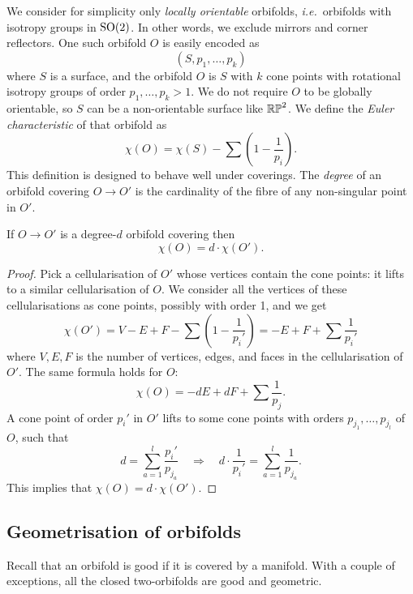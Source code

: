We consider for simplicity only \emph{locally orientable} orbifolds, \emph{i.e.}~orbifolds with isotropy groups in ${\rm SO}(2)$. In other words, we exclude mirrors and corner reflectors. One such orbifold $O$ is easily encoded as
$$(S, p_1, \ldots, p_k)$$
where $S$ is a surface, and the orbifold $O$ is $S$ with $k$ cone points with rotational isotropy groups of order $p_1, \ldots, p_k >1$. We do not require $O$ to be globally orientable, so $S$ can be a non-orientable surface like $\mathbb{RP}^2$. We define the \emph{Euler characteristic} of that orbifold as 
$$\chi(O) = \chi(S) - \sum \left( 1 - \frac 1{p_i} \right).$$
This definition is designed to behave well under coverings. The \emph{degree} of an orbifold covering $O\to O'$ is the cardinality of the fibre of any non-singular point in $O'$.
\begin{prop}
If $O \to O'$ is a degree-$d$ orbifold covering then 
$$\chi(O) = d \cdot \chi(O').$$
\end{prop}
\begin{proof}
Pick a cellularisation of $O'$ whose vertices contain the cone points: it lifts to a similar cellularisation of $O$. We consider all the vertices of these cellularisations as cone points, possibly with order 1, and we get
$$\chi(O') = V - E + F - \sum \left(1-\frac 1{p_i'}\right) = - E + F + \sum \frac 1 {p_i'}$$
where $V, E, F$ is the number of vertices, edges, and faces in the cellularisation of $O'$. The same formula holds for $O$: 
$$\chi(O) = - dE + dF + \sum \frac 1 {p_j}.$$
A cone point of order $p_i'$ in $O'$ lifts to some cone points with orders $p_{j_1}, \ldots, p_{j_l}$ of $O$, such that
$$d = \sum_{a=1}^l \frac {p_i'}{p_{j_a}} \quad \Longrightarrow \quad 
d \cdot \frac 1 {p_i'} = \sum_{a=1}^l \frac 1{p_{j_a}}.$$
This implies that $\chi(O) = d\cdot \chi(O')$.
\end{proof}

\subsection{Geometrisation of orbifolds}
Recall that an orbifold is good if it is covered by a manifold.
With a couple of exceptions, all the closed two-orbifolds are good and geometric.

